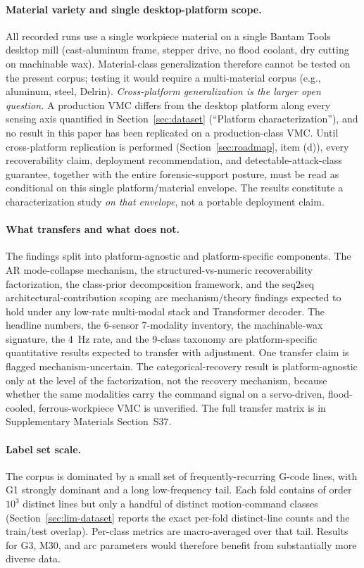 \documentclass[sensors,article,submit,moreauthors,pdftex]{Definitions/mdpi}
\begin{document}
\paragraph{Material variety and single desktop-platform scope.} All recorded runs use a single workpiece material on a single Bantam Tools desktop mill (cast-aluminum frame, stepper drive, no flood coolant, dry cutting on machinable wax). Material-class generalization therefore cannot be tested on the present corpus; testing it would require a multi-material corpus (e.g., aluminum, steel, Delrin). \emph{Cross-platform generalization is the larger open question.} A production VMC differs from the desktop platform along every sensing axis quantified in Section~\ref{sec:dataset} (``Platform characterization''), and no result in this paper has been replicated on a production-class VMC. Until cross-platform replication is performed (Section~\ref{sec:roadmap}, item (d)), every recoverability claim, deployment recommendation, and detectable-attack-class guarantee, together with the entire forensic-support posture, must be read as conditional on this single platform/material envelope. The results constitute a characterization study \emph{on that envelope}, not a portable deployment claim.

\paragraph{What transfers and what does not.} The findings split into platform-agnostic and platform-specific components. The AR mode-collapse mechanism, the structured-vs-numeric recoverability factorization, the class-prior decomposition framework, and the seq2seq architectural-contribution scoping are mechanism/theory findings expected to hold under any low-rate multi-modal stack and Transformer decoder. The headline numbers, the 6-sensor 7-modality inventory, the machinable-wax signature, the 4~Hz rate, and the 9-class taxonomy are platform-specific quantitative results expected to transfer with adjustment. One transfer claim is flagged mechanism-uncertain. The categorical-recovery result is platform-agnostic only at the level of the factorization, not the recovery mechanism, because whether the same modalities carry the command signal on a servo-driven, flood-cooled, ferrous-workpiece VMC is unverified. The full transfer matrix is in Supplementary Materials Section~S37.

\paragraph{Label set scale.} The corpus is dominated by a small set of frequently-recurring G-code lines, with G1 strongly dominant and a long low-frequency tail. Each fold contains of order $10^3$ distinct lines but only a handful of distinct motion-command classes (Section~\ref{sec:lim-dataset} reports the exact per-fold distinct-line counts and the train/test overlap). Per-class metrics are macro-averaged over that tail. Results for G3, M30, and arc parameters would therefore benefit from substantially more diverse data.
\end{document}
